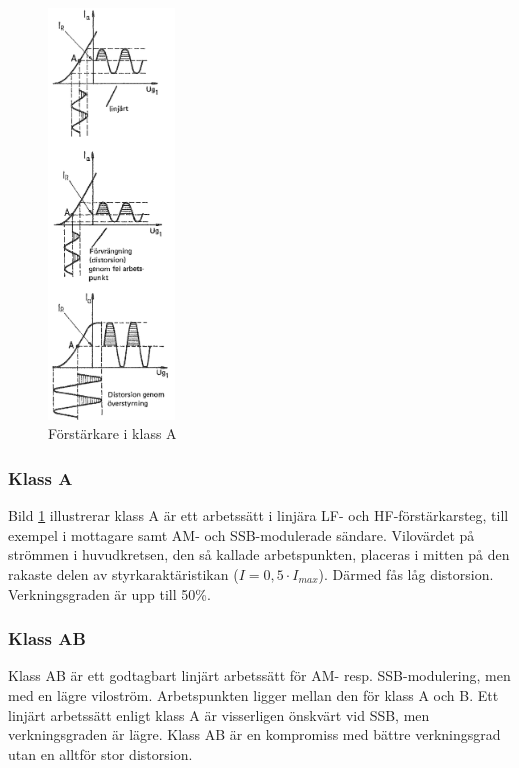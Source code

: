 \begin{figure}
\includegraphics[width=0.3\textwidth]{images/cropped_pdfs/bild_2_3-44.pdf}
\caption{Förstärkare i klass A}
\label{fig:BildII3-44}
\end{figure}

\subsubsection{Klass A}

Bild \ref{fig:BildII3-44} illustrerar klass A är ett arbetssätt i linjära
LF- och HF-förstärkarsteg, till exempel i mottagare samt AM- och SSB-modulerade
sändare.
Vilovärdet på strömmen i huvudkretsen, den så kallade arbetspunkten, placeras i
mitten på den rakaste delen av styrkaraktäristikan (\(I=0,5\cdot I_{max}\)).
Därmed fås låg distorsion.
Verkningsgraden är upp till 50\%.

\subsubsection{Klass AB}

Klass AB är ett godtagbart linjärt arbetssätt för AM- resp. SSB-modulering,
men med en lägre viloström.
Arbetspunkten ligger mellan den för klass A och B.
Ett linjärt arbetssätt enligt klass A är visserligen önskvärt vid SSB, men
verkningsgraden är lägre.
Klass AB är en kompromiss med bättre verkningsgrad utan en alltför stor
distorsion.


